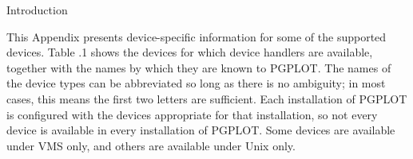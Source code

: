 

\beginsection Introduction

This Appendix presents device-specific information for some of the
supported devices. Table \the\chapnum.1 shows the devices for which
device handlers are available, together with the names by which they are
known to PGPLOT. The names of the device types can be abbreviated so
long as there is no ambiguity; in most cases, this means the first two
letters are sufficient. Each installation of PGPLOT is configured with
the devices appropriate for that installation, so not every device is
available in every installation of PGPLOT. Some devices are available
under VMS only, and others are available under Unix only. 

